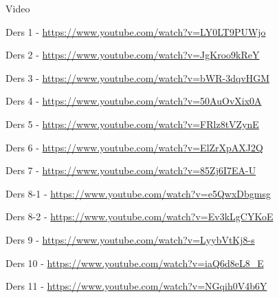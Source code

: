 \documentclass[12pt,fleqn]{article}\usepackage{../../common}
\begin{document}
Video

Ders 1 - \url{https://www.youtube.com/watch?v=LY0LT9PUWjo}

Ders 2 - \url{https://www.youtube.com/watch?v=JgKroo9kReY}

Ders 3 - \url{https://www.youtube.com/watch?v=bWR-3dqvHGM}

Ders 4 - \url{https://www.youtube.com/watch?v=50AuOvXix0A}

Ders 5 - \url{https://www.youtube.com/watch?v=FRlz8tVZynE}

Ders 6 - \url{https://www.youtube.com/watch?v=ElZrXpAXJ2Q}

Ders 7 - \url{https://www.youtube.com/watch?v=85Zj6I7EA-U}

Ders 8-1 - \url{https://www.youtube.com/watch?v=e5QwxDbgmsg}

Ders 8-2 - \url{https://www.youtube.com/watch?v=Ev3kLgCYKoE}

Ders 9 - \url{https://www.youtube.com/watch?v=LyybVtKj8-s}

Ders 10 - \url{https://www.youtube.com/watch?v=iaQ6d8eL8_E}

Ders 11 - \url{https://www.youtube.com/watch?v=NGqih0V4b6Y}
\end{document}
